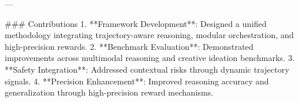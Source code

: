 ---

### Contributions
1. **Framework Development**: Designed a unified methodology integrating trajectory-aware reasoning, modular orchestration, and high-precision rewards.
2. **Benchmark Evaluation**: Demonstrated improvements across multimodal reasoning and creative ideation benchmarks.
3. **Safety Integration**: Addressed contextual risks through dynamic trajectory signals.
4. **Precision Enhancement**: Improved reasoning accuracy and generalization through high-precision reward mechanisms.